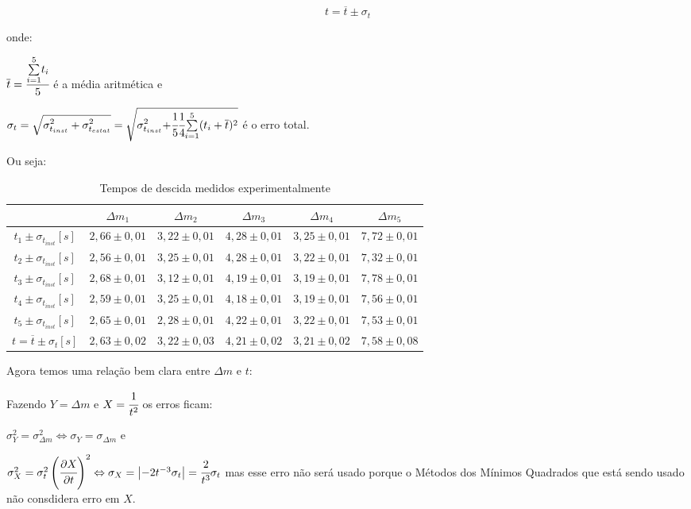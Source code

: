 \documentclass{article}
\providecommand{\tabularnewline}{\\}
\begin{document}
\[
t=\overline{t}\pm\sigma_{t}
\]
 

onde:

$\overline{t}=\cfrac[r]{\overset{{\scriptstyle 5}}{\underset{{\scriptstyle i=1}}{\sum}}t_{i}}{5}$
é a média aritmética e 

$\sigma_{t}=\sqrt{{\displaystyle \sigma_{t_{inst}}^{2}+\sigma_{t_{estat}}^{2}}}=\sqrt{{\displaystyle \sigma_{t_{inst}}^{2}+}\cfrac[r]{1}{5}\cfrac[l]{1}{4}\overset{{\scriptstyle 5}}{\underset{{\scriptstyle i=1}}{\sum}}(t_{i}+\overline{t})^{2}}$
é o erro total.

Ou seja:

\begin{table}[!ht]
\begin{centering}
\caption{Tempos de descida medidos experimentalmente}

\par\end{centering}

\centering{}%
\begin{tabular}{|c|c|c|c|c|c|}
\cline{2-6} 
\multicolumn{1}{c|}{} & $\Delta m_{1}$ & $\Delta m_{2}$ & $\Delta m_{3}$ & $\Delta m_{4}$ & $\Delta m_{5}$\tabularnewline
\hline 
$t_{1}\pm\sigma_{t_{inst}}$$[s]$ & $2,66\pm0,01$ & $3,22\pm0,01$ & $4,28\pm0,01$ & $3,25\pm0,01$ & $7,72\pm0,01$\tabularnewline
\hline 
$t_{2}\pm\sigma_{t_{inst}}$$[s]$ & $2,56\pm0,01$ & $3,25\pm0,01$ & $4,28\pm0,01$ & $3,22\pm0,01$ & $7,32\pm0,01$\tabularnewline
\hline 
$t_{3}\pm\sigma_{t_{inst}}$$[s]$ & $2,68\pm0,01$ & $3,12\pm0,01$ & $4,19\pm0,01$ & $3,19\pm0,01$ & $7,78\pm0,01$\tabularnewline
\hline 
$t_{4}\pm\sigma_{t_{inst}}$$[s]$ & $2,59\pm0,01$ & $3,25\pm0,01$ & $4,18\pm0,01$ & $3,19\pm0,01$ & $7,56\pm0,01$\tabularnewline
\hline 
$t_{5}\pm\sigma_{t_{inst}}$$[s]$ & $2,65\pm0,01$ & $2,28\pm0,01$ & $4,22\pm0,01$ & $3,22\pm0,01$ & $7,53\pm0,01$\tabularnewline
\hline 
$t=\overline{t}\pm\sigma_{t}$$[s]$ & $2,63\pm0,02$ & $3,22\pm0,03$ & $4,21\pm0,02$ & $3,21\pm0,02$ & $7,58\pm0,08$\tabularnewline
\hline 
\end{tabular}
\end{table}


Agora temos uma relação bem clara entre $\Delta m$ e $t$:

Fazendo $Y=\Delta m$ e $X=\cfrac{1}{t^{2}}$ os erros ficam:

$\sigma_{Y}^{2}=\sigma_{\Delta m}^{2}\Leftrightarrow\sigma_{Y}=\sigma_{\Delta m}$
e 

$\sigma_{X}^{2}=\sigma_{t}^{2}\left(\cfrac{\partial X}{\partial t}\right)^{2}\Leftrightarrow\sigma_{X}=\left|-2t^{-3}\sigma_{t}\right|=\cfrac{2}{t^{3}}\sigma_{t}$
mas esse erro não será usado porque o Métodos dos Mínimos Quadrados
que está sendo usado não consdidera erro em $X$.
\end{document}
